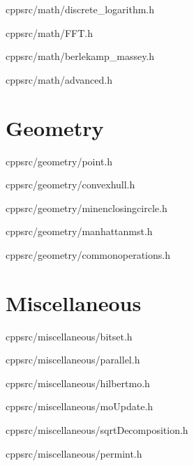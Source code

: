 \documentclass[portrait, 8pt, a4paper, oneside, twocolumn]{extarticle}
\begin{document}
    {}
    {}
    {cpp}{src/math/discrete_logarithm.h}
    \noindent\hrulefill

    {}
    {}
    {cpp}{src/math/FFT.h}
    \noindent\hrulefill
    
    {}
    {}
    {cpp}{src/math/berlekamp_massey.h}
    \noindent\hrulefill

	{}
	{}
	{cpp}{src/math/advanced.h}
	\noindent\hrulefill
\section{Geometry}

    {}
    {}
    {cpp}{src/geometry/point.h}
    \noindent\hrulefill

    {}
    {}
    {cpp}{src/geometry/convexhull.h}
    \noindent\hrulefill

    {}
    {}
    {cpp}{src/geometry/minenclosingcircle.h}
    \noindent\hrulefill

    {}
    {}
    {cpp}{src/geometry/manhattanmst.h}
    \noindent\hrulefill

    {}
    {}
    {cpp}{src/geometry/commonoperations.h}
    \noindent\hrulefill

\section{Miscellaneous}
	{}
	{}
	{cpp}{src/miscellaneous/bitset.h}
	\noindent\hrulefill
    
	{}
	{}
	{cpp}{src/miscellaneous/parallel.h}
	\noindent\hrulefill
    
    {}
    {}
    {cpp}{src/miscellaneous/hilbertmo.h}
    \noindent\hrulefill

    {}
    {}
    {cpp}{src/miscellaneous/moUpdate.h}
    \noindent\hrulefill

    {}
    {}
    {cpp}{src/miscellaneous/sqrtDecomposition.h}
    \noindent\hrulefill

    {}
    {}
    {cpp}{src/miscellaneous/permint.h}
    \noindent\hrulefill
\end{document}
